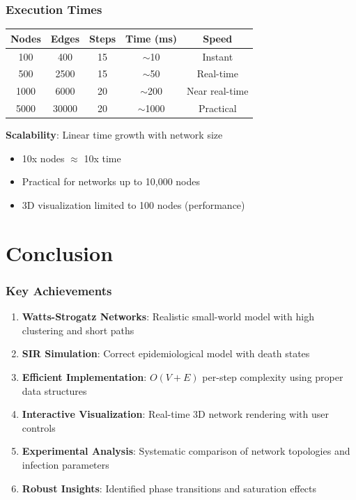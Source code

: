 \documentclass{beamer}
\begin{document}
\begin{frame}
\frametitle{Execution Times}

\begin{table}
\centering
\begin{tabular}{ccccc}
\toprule
\textbf{Nodes} & \textbf{Edges} & \textbf{Steps} & \textbf{Time (ms)} & \textbf{Speed} \\
\midrule
100 & 400 & 15 & $\sim$10 & Instant \\
500 & 2500 & 15 & $\sim$50 & Real-time \\
1000 & 6000 & 20 & $\sim$200 & Near real-time \\
5000 & 30000 & 20 & $\sim$1000 & Practical \\
\bottomrule
\end{tabular}
\end{table}

\vspace{1cm}

\textbf{Scalability}: Linear time growth with network size
\begin{itemize}
    \item 10x nodes $\approx$ 10x time
    \item Practical for networks up to 10,000 nodes
    \item 3D visualization limited to 100 nodes (performance)
\end{itemize}
\end{frame}

\section{Conclusion}

\begin{frame}
\frametitle{Key Achievements}

\begin{enumerate}
    \item \textbf{Watts-Strogatz Networks}: Realistic small-world model with high clustering and short paths
    
    \item \textbf{SIR Simulation}: Correct epidemiological model with death states
    
    \item \textbf{Efficient Implementation}: $O(V+E)$ per-step complexity using proper data structures
    
    \item \textbf{Interactive Visualization}: Real-time 3D network rendering with user controls
    
    \item \textbf{Experimental Analysis}: Systematic comparison of network topologies and infection parameters
    
    \item \textbf{Robust Insights}: Identified phase transitions and saturation effects
\end{enumerate}
\end{frame}
\end{document}
